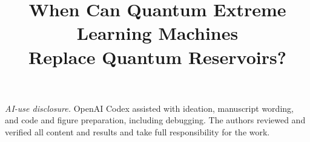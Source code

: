 \documentclass[a4paper,twoside]{article}
\begin{document}
\title{When Can Quantum Extreme Learning Machines\\Replace Quantum Reservoirs?}
\author{}
\onecolumn\maketitle\normalsize\setcounter{footnote}{0}\vfill






\FloatBarrier


{\small{}}
\par\noindent\textit{AI-use disclosure.}
OpenAI Codex assisted with ideation, manuscript wording, and code and figure
preparation, including debugging. The authors reviewed and verified all
content and results and take full responsibility for the work.


\end{document}
